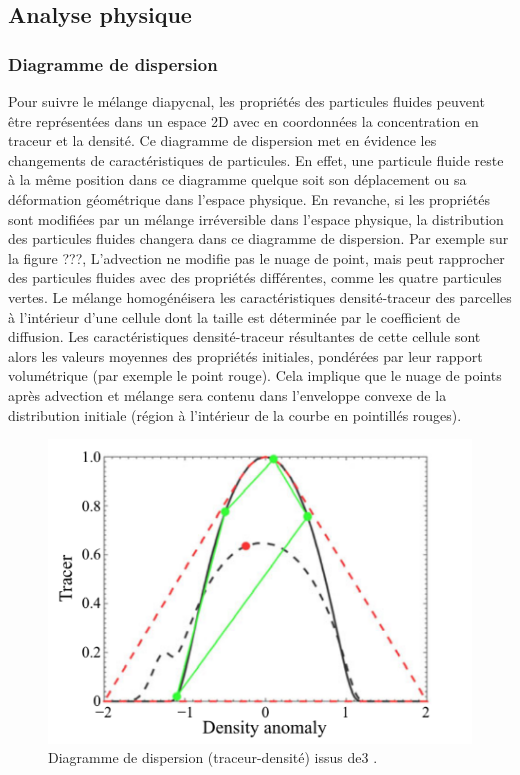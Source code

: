 \documentclass[a4paper,12pt]{article}
\begin{document}
    \subsection{Analyse physique}
    
        \subsubsection{Diagramme de dispersion}
        
        Pour suivre le mélange diapycnal, les propriétés des particules fluides peuvent être représentées dans un espace 2D avec en coordonnées la concentration en traceur et la densité. 
        Ce diagramme de dispersion met en évidence les changements de caractéristiques de particules. En effet, une particule fluide reste à la même position dans ce diagramme quelque soit son déplacement ou sa déformation géométrique dans l'espace physique. En revanche, si les propriétés sont modifiées par un mélange irréversible dans l'espace physique, la distribution des particules fluides changera dans ce diagramme de dispersion. Par exemple sur la figure ???, L'advection ne modifie pas le nuage de point, mais peut rapprocher des particules fluides avec des propriétés différentes, comme les quatre particules vertes. Le mélange homogénéisera les caractéristiques densité-traceur des parcelles à l'intérieur d'une cellule dont la taille est déterminée par le coefficient de diffusion. Les caractéristiques densité-traceur résultantes de cette cellule sont alors les valeurs moyennes des propriétés initiales, pondérées par leur rapport volumétrique (par exemple le point rouge). Cela implique que le nuage de points après advection et mélange sera contenu dans l'enveloppe convexe de la distribution initiale (région à l'intérieur de la courbe en pointillés rouges). \\
        \begin{figure}[!h]
            \centering
            \label{Fig8}
            \includegraphics{figures/fig8_Jared.PNG}
            \caption{Diagramme de dispersion (traceur-densité) issus de3
            \cite{penney_diapycnal_2020}.}
        \end{figure}
\end{document}
